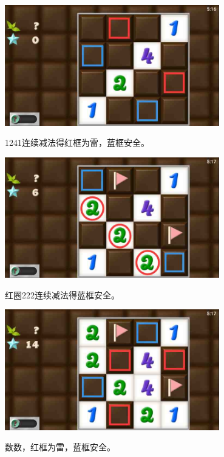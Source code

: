 \subsection{} %
\begin{center}
    \includegraphics[width=0.7\textwidth]{puzzlelow/79-1.jpg}
\end{center}
1241连续减法得红框为雷，蓝框安全。
\begin{center}
    \includegraphics[width=0.7\textwidth]{puzzlelow/79-2.jpg}
\end{center}
红圈222连续减法得蓝框安全。
\begin{center}
    \includegraphics[width=0.7\textwidth]{puzzlelow/79-3.jpg}
\end{center}
数数，红框为雷，蓝框安全。

